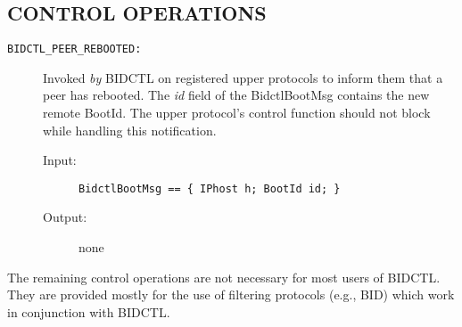 \subsection*{CONTROL OPERATIONS}

\begin{description}

\item[{\tt BIDCTL\_PEER\_REBOOTED:}]
Invoked {\em by} BIDCTL on registered upper protocols to inform them
that a peer has rebooted.  The {\em id} field of the BidctlBootMsg
contains the new remote BootId.  The upper protocol's control function
should not block while handling this notification.

\begin{description}
\item[{\rm Input:}] { \tt BidctlBootMsg ==  \{ IPhost h; BootId id; \} }
\item[{\rm Output:}] none
\end{description}

\end{description}

The remaining control operations are not necessary for most users of
BIDCTL.  They are provided mostly for the use of filtering protocols
(e.g., BID)
which work in conjunction with BIDCTL.

